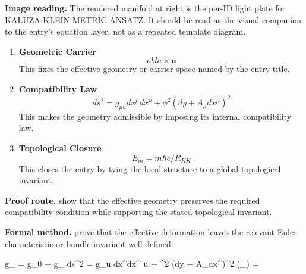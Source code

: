 \begin{samepage}
\noindent\begin{minipage}[t]{0.45\linewidth}
\vspace{0pt}
\raggedright
\scriptsize\textbf{Image reading.} The rendered manifold at right is the per-ID light plate for KALUZA-KLEIN METRIC ANSATZ. It should be read as the visual companion to the entry's equation layer, not as a repeated template diagram.\par
\end{minipage}\hfill
\begin{minipage}[t]{0.53\linewidth}
\vspace*{-0.10in}
\raggedright
{}
\end{minipage}
\end{samepage}

\clearpage


\begin{enumerate}[leftmargin=1.6em,itemsep=9pt,topsep=6pt]
\item \textbf{Geometric Carrier}
\[
abla \times \mathbf{u}
\]
This fixes the effective geometry or carrier space named by the entry title.

\item \textbf{Compatibility Law}
\[
ds^2 = g_{\mu u} dx^\mu dx^ u + \phi^2 (dy + A_\mu dx^\mu)^2
\]
This makes the geometry admissible by imposing its internal compatibility law.

\item \textbf{Topological Closure}
\[
E_m = m \hbar c / R_{KK}
\]
This closes the entry by tying the local structure to a global topological invariant.
\end{enumerate}

\textbf{Proof route.} show that the effective geometry preserves the required compatibility condition while supporting the stated topological invariant.

\textbf{Formal method.} prove that the effective deformation leaves the relevant Euler characteristic or bundle invariant well-defined.

\medskip
{}

\begin{tzpsnapshot}
\end{tzpsnapshot}

\tzpequationlinks
  {g_{} = g_0 +  g_{}}
  {ds^2 = g_{\mu u} dx^\mu dx^ u + \phi^2 (dy + A_\mu dx^\mu)^2}
  {\chi(_{}) = \cdots}
